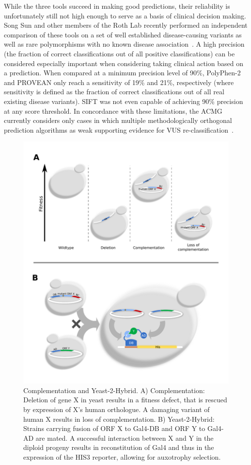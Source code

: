 While the three tools succeed in making good predictions, their reliability is unfortunately still not high enough to serve as a basis of clinical decision making. Song Sun and other members of the Roth Lab recently performed an independent comparison of these tools on a set of well established disease-causing variants as well as rare polymorphisms with no known disease association~\cite{sun_extended_2016}. A high precision (the fraction of correct classifications out of all positive classifications) can be considered especially important when considering taking clinical action based on a prediction. When compared at a minimum precision level of 90\%, PolyPhen-2 and PROVEAN only reach a sensitivity of 19\% and 21\%, respectively (where sensitivity is defined as the fraction of correct classifications out of all real existing disease variants). SIFT was not even capable of achieving 90\% precision at any score threshold. In concordance with these limitations, the ACMG currently considers only cases in which multiple methodologically orthogonal prediction algorithms as weak supporting evidence for VUS re-classification~\cite{richards_standards_2015}.

\begin{figure}[h!]
	\centering
	\includegraphics[width=\textwidth]{img/compl_y2h.pdf}
	\caption{Complementation and Yeast-2-Hybrid. A) Complementation: Deletion of gene X in yeast results in a fitness defect, that is rescued by expression of X's human orthologue. A damaging variant of human X results in loss of complementation. B) Yeast-2-Hybrid: Strains carrying fusion of ORF X to Gal4-DB and ORF Y to Gal4-AD are mated. A successful interaction between X and Y in the diploid progeny results in reconstitution of Gal4 and thus in the expression of the HIS3 reporter, allowing for auxotrophy selection.}
	\label{fig:compl_y2h}
\end{figure}

